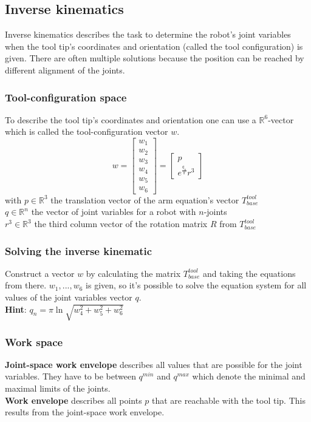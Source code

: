 \documentclass[12pt]{article}
\newcommand{\R}{\mathbb{R}}
\begin{document}
	\subsection{Inverse kinematics}
	Inverse kinematics describes the task to determine the robot's joint variables when the tool tip's coordinates and orientation (called the tool configuration) is given. There are often multiple solutions because the position can be reached by different alignment of the joints.
	
	\subsubsection{Tool-configuration space}
	To describe the tool tip's coordinates and orientation one can use a $\R^6$-vector which is called the tool-configuration vector $w$.\\
	\begin{equation}
	w = 
	\begin{bmatrix}
	w_1 \\ w_2 \\ w_3 \\ w_4 \\ w_5 \\ w_6
	\end{bmatrix} = 
	\begin{bmatrix}
	p \\ e^{\frac{q_n}{\pi}}r^3
	\end{bmatrix}
	\end{equation}
	with $p \in \R^3$ the translation vector of the arm equation's vector $T^{tool}_{base}$\\
	$q \in \R^n$ the vector of joint variables for a robot with $n$-joints\\
	$r^3 \in \R^3$ the third column vector of the rotation matrix $R$ from $T^{tool}_{base}$
	
	\subsubsection{Solving the inverse kinematic}
	Construct a vector $w$ by calculating the matrix $T^{tool}_{base}$ and taking the equations from there. $w_1, ..., w_6$ is given, so it's possible to solve the equation system for all values of the joint variables vector $q$.\\
	\textbf{Hint}: $q_n = \pi \ln \sqrt{w_4^2+w_5^2+w_6^2}$
	
	\subsubsection{Work space}
	\textbf{Joint-space work envelope} describes all values that are possible for the joint variables. They have to be between $q^{min}$ and $q^{max}$ which denote the minimal and maximal limits of the joints.\\
	\textbf{Work envelope} describes all points $p$ that are reachable with the tool tip. This results from the joint-space work envelope.
	
\end{document}
